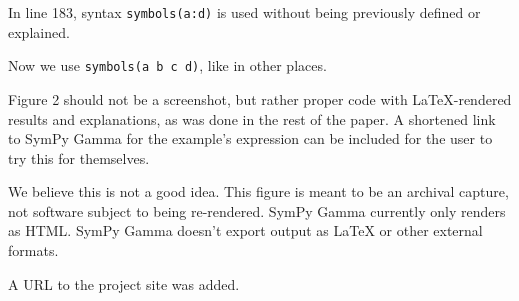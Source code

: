 \documentclass[answers,12pt]{exam}
\begin{document}
\begin{questions}
\question In line 183, syntax \texttt{symbols(\textquotesingle{}a:d\textquotesingle{})} is used without being previously defined or explained.
\begin{solution}
Now we use \texttt{symbols(\textquotesingle{}a b c d\textquotesingle{})}, like in other places.
\end{solution}

\question Figure 2 should not be a screenshot, but rather proper code with \LaTeX-rendered results and explanations, as was done in the rest of the paper. A
 shortened link to SymPy Gamma for the example's expression can be included
 for the user to try this for themselves.
\begin{solution}
We believe this is not a good idea.  This figure is meant to be an archival
capture, not software subject to being re-rendered. SymPy Gamma currently only
renders as HTML\@. SymPy Gamma doesn't export output as \LaTeX{} or other external
formats.

A URL to the project site was added.
\end{solution}

\end{questions}
\end{document}
